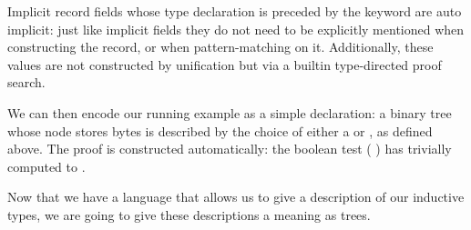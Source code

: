 \begin{remark}
  Implicit record fields whose type declaration is preceded by the
   keyword are auto implicit: just like implicit
  fields they do not need to be explicitly mentioned when constructing
  the record, or when pattern-matching on it.
  Additionally, these values are not constructed by unification but
  via a builtin type-directed proof search.
\end{remark}

We can then encode our running example as a simple 
declaration: a binary tree whose node stores bytes is described by the choice
of either a  or , as defined above.
The proof  is constructed automatically:
the boolean test ( \IdrisFunction{<=} )
has trivially computed to .

\label{fig:treedesc}

Now that we have a language that allows us to give a description of our
inductive types, we are going to give these descriptions a meaning as trees.

